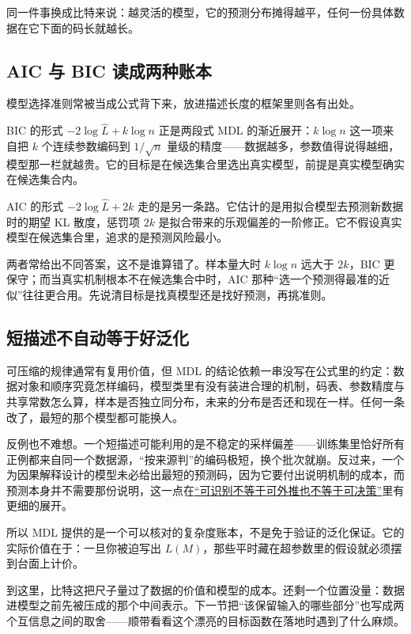 同一件事换成比特来说：越灵活的模型，它的预测分布摊得越平，任何一份具体数据在它下面的码长就越长。

\subsection{AIC 与 BIC 读成两种账本}

模型选择准则常被当成公式背下来，放进描述长度的框架里则各有出处。

BIC 的形式 \(-2\log\hat L+k\log n\) 正是两段式 MDL 的渐近展开：\(k\log n\) 这一项来自把 \(k\) 个连续参数编码到 \(1/\sqrt{n}\) 量级的精度——数据越多，参数值得说得越细，模型那一栏就越贵。它的目标是在候选集合里选出真实模型，前提是真实模型确实在候选集合内。

AIC 的形式 \(-2\log\hat L+2k\) 走的是另一条路。它估计的是用拟合模型去预测新数据时的期望 KL 散度，惩罚项 \(2k\) 是拟合带来的乐观偏差的一阶修正。它不假设真实模型在候选集合里，追求的是预测风险最小。

两者常给出不同答案，这不是谁算错了。样本量大时 \(k\log n\) 远大于 \(2k\)，BIC 更保守；而当真实机制根本不在候选集合中时，AIC 那种``选一个预测得最准的近似''往往更合用。先说清目标是找真模型还是找好预测，再挑准则。

\subsection{短描述不自动等于好泛化}

可压缩的规律通常有复用价值，但 MDL 的结论依赖一串没写在公式里的约定：数据对象和顺序究竟怎样编码，模型类里有没有装进合理的机制，码表、参数精度与共享常数怎么算，样本是否独立同分布，未来的分布是否还和现在一样。任何一条改了，最短的那个模型都可能换人。

反例也不难想。一个短描述可能利用的是不稳定的采样偏差——训练集里恰好所有正例都来自同一个数据源，``按来源判''的编码极短，换个批次就崩。反过来，一个为因果解释设计的模型未必给出最短的预测码，因为它要付出说明机制的成本，而预测本身并不需要那份说明，这一点在\hyperref[sec:13-Machine-Learning/12-Causal-Inference/06]{``可识别不等于可外推也不等于可决策''}里有更细的展开。

所以 MDL 提供的是一个可以核对的复杂度账本，不是免于验证的泛化保证。它的实际价值在于：一旦你被迫写出 \(L(M)\)，那些平时藏在超参数里的假设就必须摆到台面上计价。

到这里，比特这把尺子量过了数据的价值和模型的成本。还剩一个位置没量：数据进模型之前先被压成的那个中间表示。下一节把``该保留输入的哪些部分''也写成两个互信息之间的取舍——顺带看看这个漂亮的目标函数在落地时遇到了什么麻烦。
